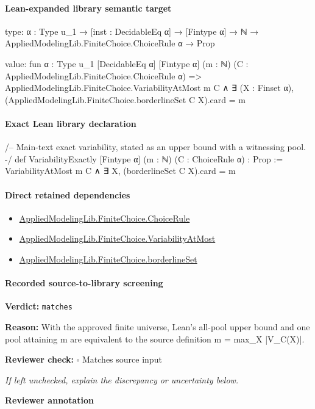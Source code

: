 \documentclass[10pt]{article}
\newcommand{\reviewerbox}{%
  \par\noindent\fbox{\parbox{0.96\linewidth}{\rule{0pt}{0.38in}}}\par
}
\newcommand{\reviewmatch}[1]{%
  \par\noindent\textbf{Reviewer check:} $\square$\; #1\par
  \noindent\emph{If left unchecked, explain the discrepancy or uncertainty below.}\par
}
\begin{document}
\paragraph{Lean-expanded library semantic target}
\begin{ReviewVerbatim}
type:
{α : Type u_1} → [inst : DecidableEq α] → [Fintype α] → ℕ → AppliedModelingLib.FiniteChoice.ChoiceRule α → Prop

value:
fun {α : Type u_1} [DecidableEq α] [Fintype α] (m : ℕ) (C : AppliedModelingLib.FiniteChoice.ChoiceRule α) =>
  AppliedModelingLib.FiniteChoice.VariabilityAtMost m C ∧
    ∃ (X : Finset α), (AppliedModelingLib.FiniteChoice.borderlineSet C X).card = m
\end{ReviewVerbatim}

\paragraph{Exact Lean library declaration}
\begin{ReviewVerbatim}
/-- Main-text exact variability, stated as an upper bound with a witnessing pool. -/
def VariabilityExactly [Fintype α] (m : ℕ) (C : ChoiceRule α) : Prop :=
  VariabilityAtMost m C ∧ ∃ X, (borderlineSet C X).card = m
\end{ReviewVerbatim}

\paragraph{Direct retained dependencies}
\begin{itemize}\raggedright
\item \hyperlink{library-prerequisite-5dea5c3766008208}{Applied\allowbreak{}Modeling\allowbreak{}Lib.\allowbreak{}Finite\allowbreak{}Choice.\allowbreak{}Choice\allowbreak{}Rule}
\item \hyperlink{library-prerequisite-abc5950f6d631dc4}{Applied\allowbreak{}Modeling\allowbreak{}Lib.\allowbreak{}Finite\allowbreak{}Choice.\allowbreak{}Variability\allowbreak{}At\allowbreak{}Most}
\item \hyperlink{library-prerequisite-5ba6bdc0420301d7}{Applied\allowbreak{}Modeling\allowbreak{}Lib.\allowbreak{}Finite\allowbreak{}Choice.\allowbreak{}borderline\allowbreak{}Set}
\end{itemize}
\paragraph{Recorded source-to-library screening}
\textbf{Verdict:} \texttt{matches}
\\
{\raggedright
\textbf{Reason:} With the approved finite universe, Lean's all-\allowbreak{}pool upper bound and one pool attaining m are equivalent to the source definition m = max\_\allowbreak{}X |V\_\allowbreak{}C(X)|.\allowbreak{}
\par}
\reviewmatch{Matches source input}
\noindent\textbf{Reviewer annotation}\par
\reviewerbox
\clearpage
\hypertarget{library-prerequisite-c55a3088f91fbde6}{}
\end{document}
